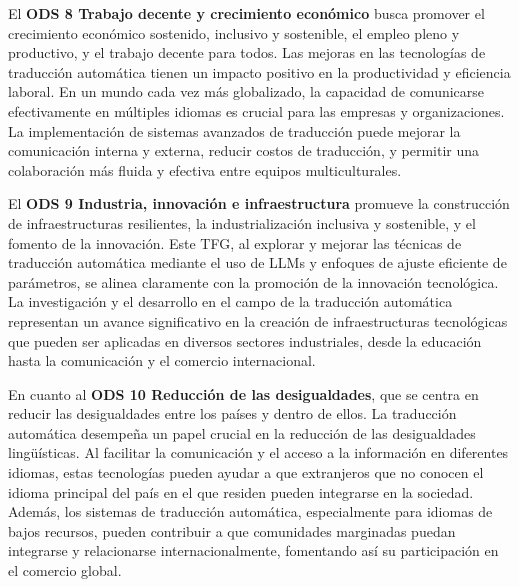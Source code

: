 \documentclass[11pt]{article}
\begin{document}
\vspace{1ex}

El \textbf{ODS 8 Trabajo decente y crecimiento económico} busca promover el crecimiento económico sostenido, inclusivo y sostenible, el empleo pleno y productivo, y el trabajo decente para todos. Las mejoras en las tecnologías de traducción automática tienen un impacto positivo en la productividad y eficiencia laboral. En un mundo cada vez más globalizado, la capacidad de comunicarse efectivamente en múltiples idiomas es crucial para las empresas y organizaciones. La implementación de sistemas avanzados de traducción puede mejorar la comunicación interna y externa, reducir costos de traducción, y permitir una colaboración más fluida y efectiva entre equipos multiculturales.

\vspace{1ex}

El \textbf{ODS 9 Industria, innovación e infraestructura} promueve la construcción de infraestructuras resilientes, la industrialización inclusiva y sostenible, y el fomento de la innovación. Este TFG, al explorar y mejorar las técnicas de traducción automática mediante el uso de LLMs y enfoques de ajuste eficiente de parámetros, se alinea claramente con la promoción de la innovación tecnológica. La investigación y el desarrollo en el campo de la traducción automática representan un avance significativo en la creación de infraestructuras tecnológicas que pueden ser aplicadas en diversos sectores industriales, desde la educación hasta la comunicación y el comercio internacional.

\vspace{1ex}

En cuanto al \textbf{ODS 10 Reducción de las desigualdades}, que se centra en reducir las desigualdades entre los países y dentro de ellos. La traducción automática desempeña un papel crucial en la reducción de las desigualdades lingüísticas. Al facilitar la comunicación y el acceso a la información en diferentes idiomas, estas tecnologías pueden ayudar a que extranjeros que no conocen el idioma principal del país en el que residen pueden integrarse en la sociedad. Además, los sistemas de traducción automática, especialmente para idiomas de bajos recursos, pueden contribuir a que comunidades marginadas puedan integrarse y relacionarse internacionalmente, fomentando así su participación en el comercio global.

\newpage

\vspace*{1ex}
\end{document}
